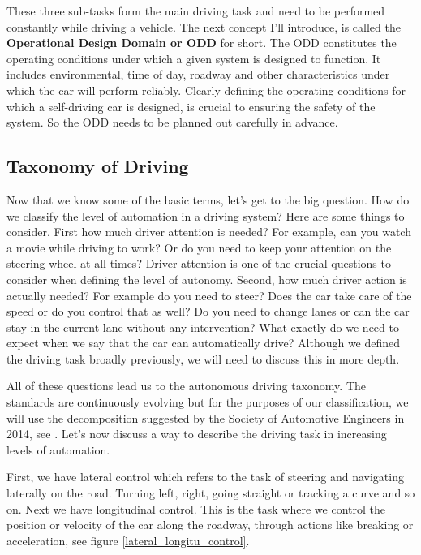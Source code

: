 These three sub-tasks form the main driving task and need to be performed constantly while driving a vehicle. The next concept I'll introduce, is called the {\textbf {Operational Design Domain or ODD}} for short. The ODD constitutes the operating conditions under which a given system is designed to function. It includes environmental, time of day, roadway and other characteristics under which the car will perform reliably. Clearly defining the operating conditions for which a self-driving car is designed, is crucial to ensuring the safety of the system. So the ODD needs to be planned out carefully in advance. 

\subsection{Taxonomy of Driving}
\label{driving_taxonomy}

Now that we know some of the basic terms, let's get to the big question. How do we classify the level of automation in a driving system? 
Here are some things to consider. First how much driver attention is needed? For example, can you watch a movie while driving to work? Or do you need to keep your attention on the steering wheel at all times? Driver attention is one of the crucial questions to consider when defining the level of autonomy. Second, how much driver action is actually needed? For example do you need to steer? Does the car take care of the speed or do you control that as well? Do you need to change lanes or can the car stay in the current lane without any intervention? What exactly do we need to expect when we say that the car can automatically drive? Although we defined the driving task broadly previously, we will need to discuss this in more depth. 

All of these questions lead us to the autonomous driving taxonomy. The standards are continuously evolving but for the purposes of our classification, we will use the decomposition suggested by the Society of Automotive Engineers in 2014, see \cite{SAE2014, SAE2016}. Let's now discuss a way to describe the driving task in increasing levels of automation. 

First, we have lateral control which refers to the task of steering and navigating laterally on the road. Turning left, right, going straight or tracking a curve and so on. Next we have longitudinal control. This is the task where we control the position or velocity of the car along the roadway, through actions like breaking or acceleration, see figure \ref{lateral_longitu_control}. 


